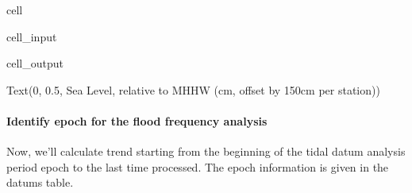 \documentclass[letterpaper,10pt,english]{jupyterBook}
\begin{document}
\begin{sphinxuseclass}{cell}
\begin{sphinxVerbatimInput}
\begin{sphinxuseclass}{cell_input}
\end{sphinxuseclass}\end{sphinxVerbatimInput}
\begin{sphinxVerbatimOutput}

\begin{sphinxuseclass}{cell_output}
\begin{sphinxVerbatim}[commandchars=\\\{\}]
Text(0, 0.5, \PYGZsq{}Sea Level, relative to MHHW (cm, offset by 150cm per station)\PYGZsq{})
\end{sphinxVerbatim}

\noindent{}

\end{sphinxuseclass}\end{sphinxVerbatimOutput}

\end{sphinxuseclass}

\paragraph{Identify epoch for the flood frequency analysis}
\label{\detokenize{notebooks/FloodFrequency:identify-epoch-for-the-flood-frequency-analysis}}
\sphinxAtStartPar
Now, we’ll calculate trend starting from the beginning of the tidal datum analysis period epoch to the last time processed. The  epoch information is given in the datums table.
\end{document}
